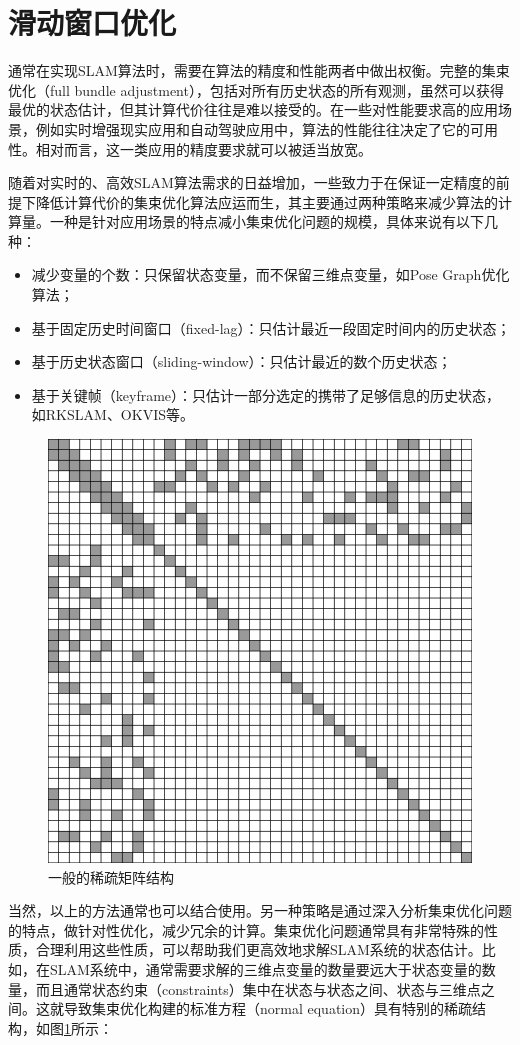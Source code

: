 \section{滑动窗口优化}

通常在实现SLAM算法时，需要在算法的精度和性能两者中做出权衡。完整的集束优化（full bundle adjustment），包括对所有历史状态的所有观测，虽然可以获得最优的状态估计，但其计算代价往往是难以接受的。在一些对性能要求高的应用场景，例如实时增强现实应用和自动驾驶应用中，算法的性能往往决定了它的可用性。相对而言，这一类应用的精度要求就可以被适当放宽。

随着对实时的、高效SLAM算法需求的日益增加，一些致力于在保证一定精度的前提下降低计算代价的集束优化算法应运而生，其主要通过两种策略来减少算法的计算量。一种是针对应用场景的特点减小集束优化问题的规模，具体来说有以下几种：

\begin{itemize}
  \item 减少变量的个数：只保留状态变量，而不保留三维点变量，如Pose Graph优化算法\citep{lu1997globally}；
  \item 基于固定历史时间窗口（fixed-lag\citep{dong2011motion}）：只估计最近一段固定时间内的历史状态；
  \item 基于历史状态窗口（sliding-window\citep{mouragnon2006real}）：只估计最近的数个历史状态；
  \item 基于关键帧（keyframe）：只估计一部分选定的携带了足够信息的历史状态，如RKSLAM\citep{liu2016robust}、OKVIS\citep{leutenegger2015keyframe}等。
\end{itemize}

\begin{figure}[htbp]
  \centering
  \includegraphics[width=.5\textwidth]{./figs/sparse_matrix.png}
  \caption{一般的稀疏矩阵结构}
  \label{fig:sparse_matrix}
\end{figure}

当然，以上的方法通常也可以结合使用。另一种策略是通过深入分析集束优化问题的特点，做针对性优化，减少冗余的计算。集束优化问题通常具有非常特殊的性质，合理利用这些性质，可以帮助我们更高效地求解SLAM系统的状态估计。比如，在SLAM系统中，通常需要求解的三维点变量的数量要远大于状态变量的数量，而且通常状态约束（constraints）集中在状态与状态之间、状态与三维点之间。这就导致集束优化构建的标准方程（normal equation）具有特别的稀疏结构，如图\ref{fig:sparse_matrix}所示：

